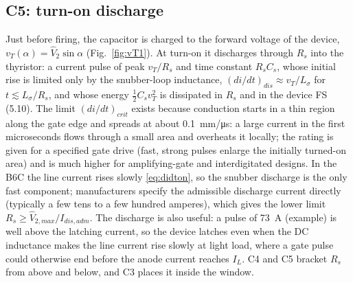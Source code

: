 \documentclass[10pt,a4paper]{scrartcl}
\newcommand{\fs}[1]{\textsf{FS}\,(#1)}
\begin{document}
\subsection{C5: turn-on discharge}\label{sec:C5}
Just before firing, the capacitor is charged to the forward voltage of the device, $v_T(\alpha) = \hat V_2\sin\alpha$ (Fig.~\ref{fig:vT1}). At turn-on it discharges through $R_s$ into the thyristor: a current pulse of peak $v_T/R_s$ and time constant $R_sC_s$, whose initial rise is limited only by the snubber-loop inductance, $(di/dt)_{dis}\approx v_T/L_\sigma$ for $t\lesssim L_\sigma/R_s$, and whose energy $\tfrac12C_sv_T^2$ is dissipated in $R_s$ and in the device \fs{5.10}. The limit $(di/dt)_{crit}$ exists because conduction starts in a thin region along the gate edge and spreads at about \SI{0.1}{mm/\micro s}: a large current in the first microseconds flows through a small area and overheats it locally; the rating is given for a specified gate drive (fast, strong pulses enlarge the initially turned-on area) and is much higher for amplifying-gate and interdigitated designs. In the B6C the line current rises slowly \eqref{eq:didton}, so the snubber discharge is the only fast component; manufacturers specify the admissible discharge current directly (typically a few tens to a few hundred amperes), which gives the lower limit $R_s\ge\hat V_{2,max}/I_{dis,adm}$. The discharge is also useful: a pulse of \SI{73}{A} (example) is well above the latching current, so the device latches even when the DC inductance makes the line current rise slowly at light load, where a gate pulse could otherwise end before the anode current reaches $I_L$. C4 and C5 bracket $R_s$ from above and below, and C3 places it inside the window.
\end{document}
